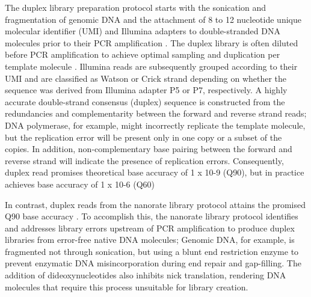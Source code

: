 The duplex library preparation protocol starts with the sonication and fragmentation of genomic DNA and the attachment of 8 to 12 nucleotide unique molecular identifier (UMI) and Illumina adapters to double-stranded DNA molecules prior to their PCR amplification \cite{Schmitt2012-yr}. The duplex library is often diluted before PCR amplification to achieve optimal sampling and duplication per template molecule \cite{Hoang2016-jx, Abascal2021-pk}. Illumina reads are subsequently grouped according to their UMI and are classified as Watson or Crick strand depending on whether the sequence was derived from Illumina adapter P5 or P7, respectively. A highly accurate double-strand consensus (duplex) sequence is constructed from the redundancies and complementarity between the forward and reverse strand reads; DNA polymerase, for example, might incorrectly replicate the template molecule, but the replication error will be present only in one copy or a subset of the copies. In addition, non-complementary base pairing between the forward and reverse strand will indicate the presence of replication errors. Consequently, duplex read promises theoretical base accuracy of 1 x 10-9 (Q90), but in practice achieves base accuracy of 1 x 10-6 (Q60) \cite{Schmitt2012-yr}

In contrast, duplex reads from the nanorate library protocol attains the promised Q90 base accuracy \cite{Abascal2021-pk}. To accomplish this, the nanorate library protocol identifies and addresses library errors upstream of PCR amplification to produce duplex libraries from error-free native DNA molecules; Genomic DNA, for example, is fragmented not through sonication, but using a blunt end restriction enzyme to prevent enzymatic DNA misincorporation during end repair and gap-filling. The addition of dideoxynucleotides also inhibits nick translation, rendering DNA molecules that require this process unsuitable for library creation. 

